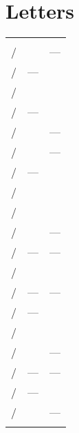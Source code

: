 \par\bigskip
\par\bigskip
\par\bigskip

\section{Letters}

\begin{longtabu}{ X[1,c,m] X[1,c,m] X[1,c,m] }
  \thrule

   &  &  \\ \mrule

  \large{} / \large{} &  & --- \\ 
  \large{} / \large{} & --- &  \\ 
  \large{} / \large{} &  &  \\ 
  \large{} / \large{} & --- &  \\ 
  \large{} / \large{} &  & --- \\ 
  \large{} / \large{} &  & --- \\ 
  \large{} / \large{} & --- &  \\ 
  \large{} / \large{} &  &  \\ 
  \large{} / \large{} &  &  \\ 
  \large{} / \large{} &  & --- \\ 
  \large{} / \large{} & --- & --- \\ 
  \large{} / \large{} &  &  \\ 
  \large{} / \large{} & --- & --- \\ 
  \large{} / \large{} & --- &  \\ 
  \large{} / \large{} &  &  \\ 
  \large{} / \large{} &  & --- \\ 
  \large{} / \large{} & --- & --- \\ 
  \large{} / \large{} & --- &  \\ 
  \large{} / \large{} &  & --- \\ 

\end{longtabu}

